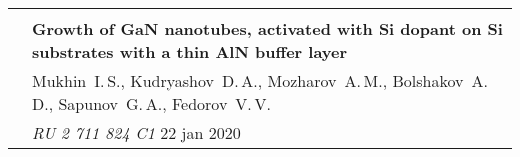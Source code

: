 \documentclass[letterpaper, 11pt]{article}
\begin{document}
\begin{longtable}{p{1.3in}p{4.8in}}
		{\color{OliveGreen}{Patent}} \\
        & \textbf{Growth of GaN nanotubes, activated with Si dopant on Si substrates
        with a thin AlN buffer layer} \\
        & Mukhin~I.\,S., Kudryashov~D.\,A., Mozharov~A.\,M., Bolshakov~A.\,D.,
        Sapunov~G.\,A., Fedorov~V.\,V. \\
        & \textit{RU 2 711 824 C1} \hfill 22 jan 2020 \\
		
		
		
		
	\end{longtable}
\end{document}
